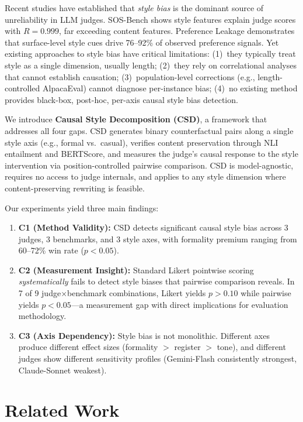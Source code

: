 \documentclass[11pt,a4paper]{article}
\begin{document}
Recent studies have established that \emph{style bias} is the dominant source of unreliability in LLM judges.
SOS-Bench shows style features explain judge scores with $R=0.999$, far exceeding content features.
Preference Leakage demonstrates that surface-level style cues drive 76--92\% of observed preference signals.
Yet existing approaches to style bias have critical limitations:
(1)~they typically treat style as a single dimension, usually length;
(2)~they rely on correlational analyses that cannot establish causation;
(3)~population-level corrections (e.g., length-controlled AlpacaEval) cannot diagnose per-instance bias;
(4)~no existing method provides black-box, post-hoc, per-axis causal style bias detection.

We introduce \textbf{Causal Style Decomposition (CSD)}, a framework that addresses all four gaps.
CSD generates binary counterfactual pairs along a single style axis (e.g., formal vs.\ casual), verifies content preservation through NLI entailment and BERTScore, and measures the judge's causal response to the style intervention via position-controlled pairwise comparison.
CSD is model-agnostic, requires no access to judge internals, and applies to any style dimension where content-preserving rewriting is feasible.

Our experiments yield three main findings:
\begin{enumerate}
    \item \textbf{C1 (Method Validity):} CSD detects significant causal style bias across 3 judges, 3 benchmarks, and 3 style axes, with formality premium ranging from 60--72\% win rate ($p<0.05$).
    \item \textbf{C2 (Measurement Insight):} Standard Likert pointwise scoring \emph{systematically} fails to detect style biases that pairwise comparison reveals. In 7 of 9 judge$\times$benchmark combinations, Likert yields $p>0.10$ while pairwise yields $p<0.05$---a measurement gap with direct implications for evaluation methodology.
    \item \textbf{C3 (Axis Dependency):} Style bias is not monolithic. Different axes produce different effect sizes (formality $>$ register $>$ tone), and different judges show different sensitivity profiles (Gemini-Flash consistently strongest, Claude-Sonnet weakest).
\end{enumerate}

\section{Related Work}
\end{document}

